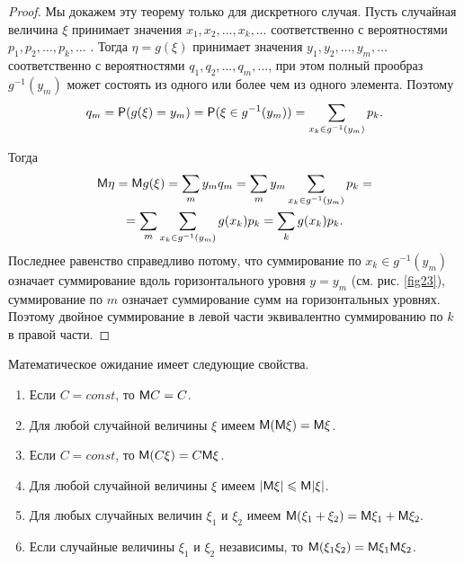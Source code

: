 \begin{proof}
	Мы докажем эту теорему только для дискретного случая.
Пусть случайная величина $\xi$ принимает значения $x_1, x_2,\ldots, x_k, \ldots$ соответственно с вероятностями $p_1, p_2,\ldots , p_k,\ldots$ . Тогда $\eta= g(\xi)$ принимает
значения $y_1, y_2, \ldots , y_m, \ldots$ соответственно с вероятностями $q_1, q_2,\ldots, q_m,\ldots $, при этом полный прообраз $g^{−1}(y_m)$ может состоять из одного или более чем из одного элемента. Поэтому
	\begin{equation*}
		q_m=\P(g(\xi)=y_m)=\P(\xi\in g^{-1}(y_m))=\sum\limits
		_{x_k\in g^{-1}(y_m)}p_k.
	\end{equation*}

	Тогда
	\begin{gather*}
	\M\eta=\M g(\xi)=\sum_m y_mq_m=\sum_m y_m \sum
	\limits_{x_k\in g^{-1}(y_m)} p_k=\\=
	\sum_m\sum\limits_{x_k\in g^{-1}(y_m)}g(x_k)p_k=\sum_kg(x_k)p_k.
	\end{gather*}
	Последнее равенство справедливо потому, что суммирование по $x_k\in g^{-1}(y_m)$ означает суммирование вдоль горизонтального уровня $y = y_m$ (см. рис. \ref{fig23}), суммирование по $m$ означает суммирование сумм на горизонтальных уровнях. Поэтому двойное суммирование в левой части эквивалентно суммированию по $k$ в правой части.
\end{proof}

\begin{theorem}
\label{th:17.5}
Математическое ожидание имеет следующие свойства.
\begin{enumerate}
	\item Если $C = const$, то $\M C = C$.
	\item Для любой случайной величины $\xi$ имеем $\M(\M\xi) = \M\xi$.
	\item Если $C = const$, то $\M(C\xi) = C\M\xi$.
	\item Для любой случайной величины $\xi$ имеем $|\M\xi| \leqslant \M|\xi|$. 
	\item Для любых случайных величин $\xi_1$ и $\xi_2$ имеем $\M(\xi_1 + \xi_2) = \M\xi_1 +\M\xi_2.$
	\item Если случайные величины $\xi_1$ и $\xi_2$ независимы, то $\M(\xi_1\xi_2) = \M\xi_1\M\xi_2$.
\end{enumerate}
\end{theorem}

